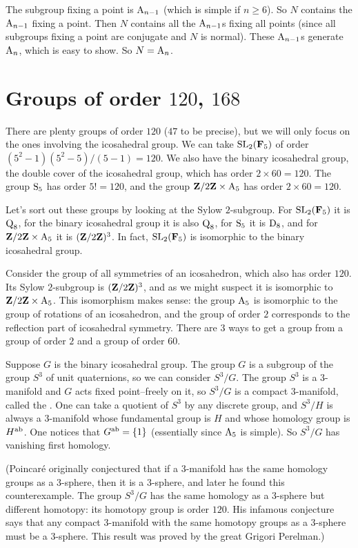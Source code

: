 \documentclass[11pt, oneside]{amsart}
\begin{document}
The subgroup fixing a point is $\operatorname{A}_{n-1}$ (which is simple if $n\ge 6$). So $N$ contains the $\operatorname{A}_{n-1}$ fixing a point. Then $N$ contains all the $\operatorname{A}_{n-1}$s fixing all points (since all subgroups fixing a point are conjugate and $N$ is normal). These $\operatorname{A}_{n-1}$s generate $\operatorname{A}_n$, which is easy to show. So $N= \operatorname{A}_n$.

\section{Groups of order $120$, $168$}
There are plenty groups of order $120$ ($47$ to be precise), but we will only focus on the ones involving the icosahedral group. We can take $\operatorname{SL}_2(\mathbf F_5)$ of order $(5^2 - 1)(5^2 -5)/(5-1)=120$. We also have the binary icosahedral group, the double cover of the icosahedral group, which has order $2\times 60 =120$. The group $\operatorname{S}_5$ has order $5!= 120$, and the group $\mathbf Z / 2\mathbf Z \times \operatorname{A}_5$ has order $2\times 60=120$.

Let's sort out these groups by looking at the Sylow $2$-subgroup. For $\operatorname{SL}_2(\mathbf F_5)$ it is $\operatorname{Q}_8$, for the binary icosahedral group it is also $\operatorname{Q}_8$, for $\operatorname{S}_5$ it is $\operatorname{D}_8$, and for $\mathbf Z / 2\mathbf Z \times \operatorname{A}_5$ it is $(\mathbf Z / 2\mathbf Z)^3$. In fact, $\operatorname{SL}_2(\mathbf F_5)$ is isomorphic to the binary icosahedral group. 

Consider the group of all symmetries of an icosahedron, which also has order $120$. Its Sylow $2$-subgroup is $(\mathbf Z / 2\mathbf Z)^3$, and as we might suspect it is isomorphic to $\mathbf Z / 2\mathbf Z \times \operatorname{A}_5$. This isomorphism makes sense: the group $\operatorname{A}_5$ is isomorphic to the group of rotations of an icosahedron, and the group of order $2$ corresponds to the reflection part of icosahedral symmetry. There are $3$ ways to get a group from a group of order $2$ and a group of order $60$.

Suppose $G$ is the binary icosahedral group. The group $G$ is a subgroup of the group $S^3$ of unit quaternions, so we can consider $S^3/G$. The group $S^3$ is a $3$-manifold and $G$ acts fixed point--freely on it, so $S^3/G$ is a compact $3$-manifold, called the . One can take a quotient of $S^3$ by any discrete group, and $S^3/H$ is always a $3$-manifold whose fundamental group is $H$ and whose homology group is $H\textsuperscript {ab}$. One notices that $G\textsuperscript {ab} =\{1\}$ (essentially since $\operatorname{A}_5$ is simple). So $S^3/G$ has vanishing first homology.

(Poincar\'e originally conjectured that if a $3$-manifold has the same homology groups as a $3$-sphere, then it is a $3$-sphere, and later he found this counterexample. The group $S^3/G$ has the same homology as a $3$-sphere but different homotopy: its homotopy group is order $120$. His infamous conjecture says that any compact $3$-manifold with the same homotopy groups as a $3$-sphere must be a $3$-sphere. This result was proved by the great Grigori Perelman.)
\end{document}

